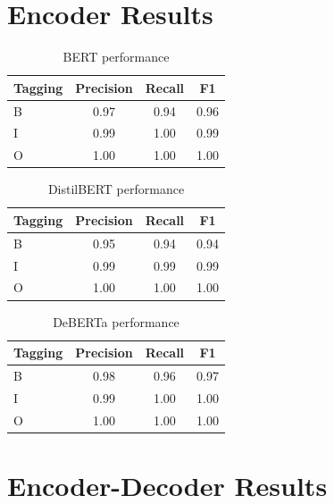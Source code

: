 \documentclass[11pt]{article}
\begin{document}
\section{Encoder Results}


\begin{table}[H]
\begin{tabular}{l c c c}
\hline
\textbf{Tagging} & \textbf{Precision} & \textbf{Recall} & \textbf{F1}\\
\hline
B & 0.97 & 0.94 & 0.96 \\
I & 0.99 & 1.00 & 0.99 \\
O & 1.00 & 1.00 & 1.00 \\

\hline
\end{tabular}

\caption{BERT performance}
\label{tab appendix encoder: bert}
\end{table}
\begin{table}[H]
\begin{tabular}{l c c c}
\hline
\textbf{Tagging} & \textbf{Precision} & \textbf{Recall} & \textbf{F1}\\
\hline
B & 0.95 & 0.94 & 0.94 \\
I & 0.99 & 0.99 & 0.99 \\
O & 1.00 & 1.00 & 1.00 \\

\hline
\end{tabular}

\caption{DistilBERT performance}
\label{tab appendix encoder: distilBERT}
\end{table}

\begin{table}[H]
\begin{tabular}{l c c c}
\hline
\textbf{Tagging} & \textbf{Precision} & \textbf{Recall} & \textbf{F1}\\
\hline
B & 0.98 & 0.96 & 0.97 \\
I & 0.99 & 1.00 & 1.00 \\
O & 1.00 & 1.00 & 1.00 \\

\hline
\end{tabular}

\caption{DeBERTa performance}
\label{tab appendix encoder: deberta}
\end{table}

\section{Encoder-Decoder Results}
\end{document}
